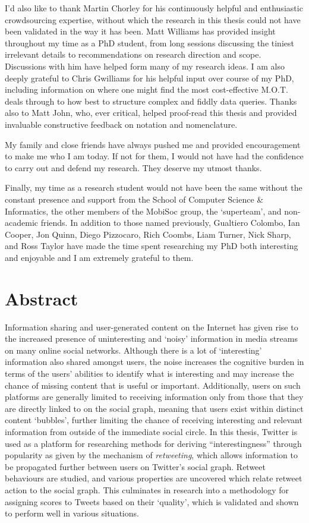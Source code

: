I'd also like to thank Martin Chorley for his continuously helpful and enthusiastic crowdsourcing expertise, without which the research in this thesis could not have been validated in the way it has been. Matt Williams has provided insight throughout my time as a PhD student, from long sessions discussing the tiniest irrelevant details to recommendations on research direction and scope. Discussions with him have helped form many of my research ideas. I am also deeply grateful to Chris Gwilliams for his helpful input over course of my PhD, including information on where one might find the most cost-effective M.O.T. deals through to how best to structure complex and fiddly data queries. Thanks also to Matt John, who, ever critical, helped proof-read this thesis and provided invaluable constructive feedback on notation and nomenclature.

My family and close friends have always pushed me and provided encouragement to make me who I am today. If not for them, I would not have had the confidence to carry out and defend my research. They deserve my utmost thanks.

Finally, my time as a research student would not have been the same without the constant presence and support from the School of Computer Science \& Informatics, the other members of the MobiSoc group, the `superteam', and non-academic friends. In addition to those named previously, Gualtiero Colombo, Ian Cooper, Jon Quinn, Diego Pizzocaro, Rich Coombs, Liam Turner, Nick Sharp, and Ross Taylor have made the time spent researching my PhD both interesting and enjoyable and I am extremely grateful to them.





\chapter*{Abstract}
Information sharing and user-generated content on the Internet has given rise to the increased presence of uninteresting and `noisy' information in media streams on many online social networks. Although there is a lot of `interesting' information also shared amongst users, the noise increases the cognitive burden in terms of the users' abilities to identify what is interesting and may increase the chance of missing content that is useful or important.
Additionally, users on such platforms are generally limited to receiving information only from those that they are directly linked to on the social graph, meaning that users exist within distinct content `bubbles', further limiting the chance of receiving interesting and relevant information from outside of the immediate social circle. 
In this thesis, Twitter is used as a platform for researching methods for deriving ``interestingness'' through popularity as given by the mechanism of \textit{retweeting}, which allows information to be propagated further between users on Twitter's social graph. Retweet behaviours are studied, and various properties are uncovered which relate retweet action to the social graph. This culminates in research into a methodology for assigning scores to Tweets based on their `quality', which is validated and shown to perform well in various situations.


